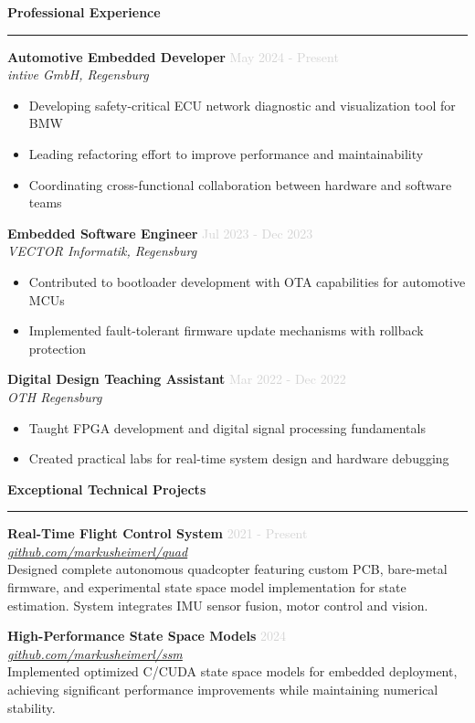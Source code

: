 \documentclass[a4paper,10pt]{article}
\newcommand{\cvsection}[1]{
    \vspace{12pt}
    {\large\bfseries\color{darkgray} #1}
    \vspace{4pt}
    \hrule
    \vspace{8pt}
}
\newcommand{\cventry}[4]{
    \vspace{3pt}
    \textbf{\color{darkgray}#1} \hfill \textcolor{lightgray}{\small #2} \\
    \textcolor{primaryblue}{\textit{\small #3}} \\
    \vspace{3pt}
    {\small #4}
    \vspace{8pt}
}
\newcommand{\cvproject}[3]{
    \vspace{3pt}
    \textbf{\color{darkgray}#1} \hfill \textcolor{lightgray}{\small #2} \\
    \textcolor{primaryblue}{\textit{\small #3}} \\[3pt]
}
\begin{document}
\begin{paracol}{2}
\cvsection{Professional Experience}

\cventry{Automotive Embedded Developer}{May 2024 - Present}{intive GmbH, Regensburg}{
    \begin{itemize}[leftmargin=10pt, itemsep=2pt, parsep=0pt, topsep=3pt]
        \item Developing safety-critical ECU network diagnostic and visualization tool for BMW
        \item Leading refactoring effort to improve performance and maintainability
        \item Coordinating cross-functional collaboration between hardware and software teams
    \end{itemize}
}

\cventry{Embedded Software Engineer}{Jul 2023 - Dec 2023}{VECTOR Informatik, Regensburg}{
    \begin{itemize}[leftmargin=10pt, itemsep=2pt, parsep=0pt, topsep=3pt]
        \item Contributed to bootloader development with OTA capabilities for automotive MCUs
        \item Implemented fault-tolerant firmware update mechanisms with rollback protection
    \end{itemize}
}

\cventry{Digital Design Teaching Assistant}{Mar 2022 - Dec 2022}{OTH Regensburg}{
    \begin{itemize}[leftmargin=10pt, itemsep=2pt, parsep=0pt, topsep=3pt]
        \item Taught FPGA development and digital signal processing fundamentals
        \item Created practical labs for real-time system design and hardware debugging
    \end{itemize}
}

\cvsection{Exceptional Technical Projects}

\cvproject{Real-Time Flight Control System}{2021 - Present}{\href{https://github.com/markusheimerl/quad}{github.com/markusheimerl/quad}}
{\small Designed complete autonomous quadcopter featuring custom PCB, bare-metal firmware, and experimental state space model implementation for state estimation. System integrates IMU sensor fusion, motor control and vision.}

\vspace{8pt}

\cvproject{High-Performance State Space Models}{2024}{\href{https://github.com/markusheimerl/ssm}{github.com/markusheimerl/ssm}}
{\small Implemented optimized C/CUDA state space models for embedded deployment, achieving significant performance improvements while maintaining numerical stability.}


\end{paracol}
\end{document}
